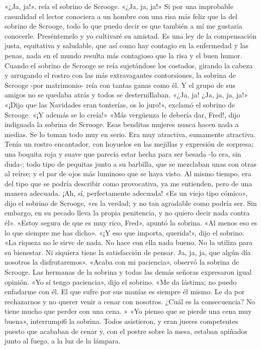 \documentclass{novela}
\begin{document}
 «¿Ja, ja!», reía el sobrino de Scrooge. «¿Ja, ja, ja!»
 Si por una improbable casualidad el lector conociera a un hombre con una risa más feliz que la del sobrino de Scrooge, todo lo que puedo decir es que también a mí me gustaría conocerle. Preséntemelo y yo cultivaré su amistad.
 Es una ley de la compensación justa, equitativa y saludable, que así como hay contagio en la enfermedad y las penas, nada en el mundo resulta más contagioso que la risa y el buen humor. Cuando el sobrino de Scrooge se reía sujetándose los costados, girando la cabeza y arrugando el rostro con las más extravagantes contorsiones, la sobrina de Scrooge -por matrimonio- reía con tantas ganas como él. Y el grupo de sus amigos no se quedaba atrás y todos se desterniIlaban.
 «¿Ja, ja! ¿Ja, ja, ja, ja!»
 «¡Dijo que las Navidades eran tonterías, os lo juro!», exclamó el sobrino de Scrooge. «¡Y además se lo creía!»
 «Más vergüenza le debería dar, Fred!, dijo indignada la sobrina de Scrooge. Esas benditas mujeres nunca hacen nada a medias. Se lo toman todo muy en serio.
 Era muy atractiva, sumamente atractiva. Tenía un rostro encantador, con hoyuelos en las mejillas y expresión de sorpresa; una boquita roja y suave que parecía estar hecha para ser besada -lo era, sin duda-; todo tipo de pequitas junto a su barbilla, que se mezclaban unas con otras al reírse; y el par de ojos más luminoso que se haya visto. Al mismo tiempo, era del tipo que se podría describir como provocativa, ya me entienden, pero de una manera adecuada. ¡Ah, sí, perfectamente adecuada!
 «Es un viejo tipo cómico», dijo el sobrino de Scrooge, «es la verdad; y no tan agradable como podría ser. Sin embargo, en su pecado lleva la propia penitencia, y no quiero decir nada contra él».
 «Estoy segura de que es muy rico, Fred», apuntó la sobrina. «Al menos eso es lo que siempre me has dicho».
 «¡Y eso que importa, querida!», dijo el sobrino. «La riqueza no le sirve de nada. No hace con ella nada bueno. No la utiliza para su bienestar. Ni siquiera tiene la satisfacción de pensar. Ja, ja, ja, que algún día nosotros la disfrutaremos».
 «Acaba con mi paciencia», observó la sobrina de Scrooge. Las hermanas de la sobrina y todas las demás señoras expresaron igual opinión.
 «Yo sí tengo paciencia», dijo el sobrino. «Me da lástima; no puedo enfadarme con él. El que sufre por sus manías es siempre él mismo. Le da por rechazarnos y no querer venir a cenar con nosotros. ¿Cuál es la consecuencia? No tiene mucho que perder con una cena. »
 «Yo pienso que se pierde una cena muy buena», interrumpi6 la sobrina. Todos asistieron, y eran jueces competentes puesto que acababan de cenar y, con el postre sobre la mesa, estaban apiñados junto al fuego, a la luz de la lámpara.
\end{document}
